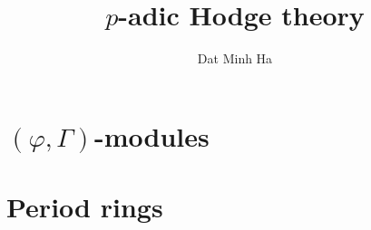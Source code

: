 

\setcounter{section}{-1}





	\title{\texorpdfstring{$p$}{}-adic Hodge theory}
	
	\author{Dat Minh Ha}
	\maketitle
	
	{
      \hypersetup{} 
      \tableofcontents %
    }
    
    
	
    \chapter{\texorpdfstring{$(\varphi, \Gamma)$}{}-modules}
        \begin{abstract}
            
        \end{abstract}
        
        \minitoc
        
        
        
           
        
    \chapter{Period rings}
        \begin{abstract}
            
        \end{abstract}
        
        \minitoc
        
        
        
        
        
